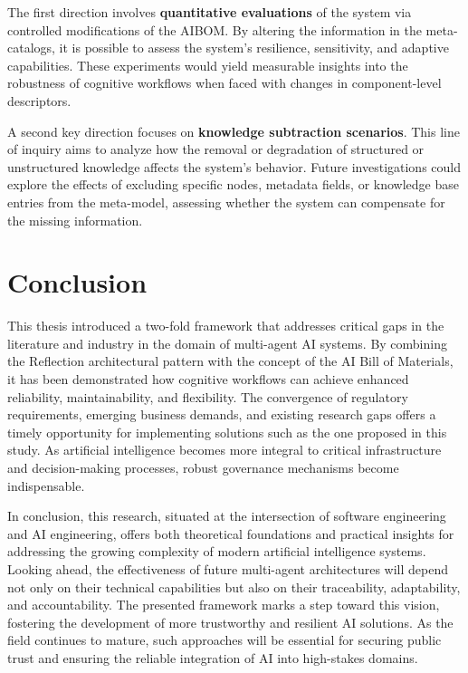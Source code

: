 The first direction involves \textbf{quantitative evaluations} of the system via controlled modifications of the AIBOM. By altering the information in the meta-catalogs, it is possible to assess the system's resilience, sensitivity, and adaptive capabilities. These experiments would yield measurable insights into the robustness of cognitive workflows when faced with changes in component-level descriptors.

A second key direction focuses on \textbf{knowledge subtraction scenarios}. This line of inquiry aims to analyze how the removal or degradation of structured or unstructured knowledge affects the system's behavior. Future investigations could explore the effects of excluding specific nodes, metadata fields, or knowledge base entries from the meta-model, assessing whether the system can compensate for the missing information.




\section{Conclusion} \label{sec:conclusion}
This thesis introduced a two-fold framework that addresses critical gaps in the literature and industry in the domain of multi-agent AI systems. By combining the Reflection architectural pattern with the concept of the AI Bill of Materials, it has been demonstrated how cognitive workflows can achieve enhanced reliability, maintainability, and flexibility. The convergence of regulatory requirements,  emerging business demands, and existing research gaps offers a timely opportunity for implementing solutions such as the one proposed in this study. As artificial intelligence becomes more integral to critical infrastructure and decision-making processes, robust governance mechanisms become indispensable. 

In conclusion, this research, situated at the intersection of software engineering and AI engineering, offers both theoretical foundations and practical insights for addressing the growing complexity of modern artificial intelligence systems. Looking ahead, the effectiveness of future multi-agent architectures will depend not only on their technical capabilities but also on their traceability, adaptability, and accountability. The presented framework marks a step toward this vision, fostering the development of more trustworthy and resilient AI solutions. As the field continues to mature, such approaches will be essential for securing public trust and ensuring the reliable integration of AI into high-stakes domains.



